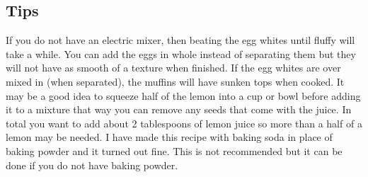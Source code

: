 \subsection*{Tips}

If you do not have an electric mixer, then beating the egg whites until fluffy will take a while. You can add the eggs in whole instead of separating them but they will not have as smooth of a texture when finished. If the egg whites are over mixed in (when separated), the muffins will have sunken tops when cooked. It may be a good idea to squeeze half of the lemon into a cup or bowl before adding it to a mixture that way you can remove any seeds that come with the juice. In total you want to add about 2 tablespoons of lemon juice so more than a half of a lemon may be needed. I have made this recipe with baking soda in place of baking powder and it turned out fine. This is not recommended but it can be done if you do not have baking powder.